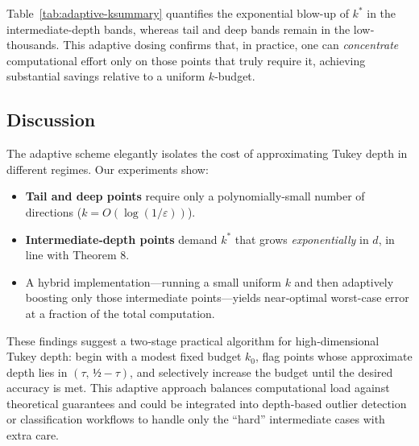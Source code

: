 \documentclass[12pt]{report}
\begin{document}
Table~\ref{tab:adaptive-ksummary} quantifies the exponential blow-up of \(k^*\) in the intermediate-depth bands, whereas tail and deep bands remain in the low‐thousands.  This adaptive dosing confirms that, in practice, one can \emph{concentrate} computational effort only on those points that truly require it, achieving substantial savings relative to a uniform \(k\)-budget.

\subsection{Discussion}
\label{ssec:adaptive-discussion}

The adaptive scheme elegantly isolates the cost of approximating Tukey depth in different regimes.  Our experiments show:

\begin{itemize}
  \item \textbf{Tail and deep points} require only a polynomially‐small number of directions (\(k=O(\log(1/\varepsilon))\)).  
  \item \textbf{Intermediate‐depth points} demand \(k^*\) that grows \emph{exponentially} in \(d\), in line with Theorem 8.  
  \item A hybrid implementation—running a small uniform \(k\) and then adaptively boosting only those intermediate points—yields near‐optimal worst-case error at a fraction of the total computation.  
\end{itemize}

These findings suggest a two‐stage practical algorithm for high‐dimensional Tukey depth: begin with a modest fixed budget \(k_0\), flag points whose approximate depth lies in \((\tau,\,½-\tau)\), and selectively increase the budget until the desired accuracy is met.  This adaptive approach balances computational load against theoretical guarantees and could be integrated into depth‐based outlier detection or classification workflows to handle only the “hard” intermediate cases with extra care.
\end{document}
